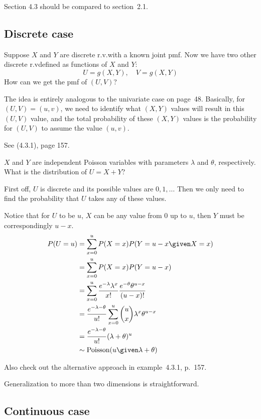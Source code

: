 \documentclass[12pt]{article}
\begin{document}
Section 4.3 should be compared to section~2.1.

\subsection{Discrete case}

Suppose $X$ and $Y$ are discrete r.v.\@ with a known joint pmf.
Now we have two other discrete r.v\@ defined as functions of $X$ and
$Y$:
\[
U = g(X, Y),\quad V = g(X, Y)
\]
How can we get the pmf of $(U, V)$?

The idea is entirely analogous to the univariate case on page~48.
Basically, for $(U,V) = (u,v)$,
we need to identify what $(X,Y)$ values will result in this $(U,V)$
value, and the total probability of these $(X,Y)$ values is the
probability for $(U,V)$ to assume the value $(u,v)$.

See (4.3.1), page 157.

\example%
$X$ and $Y$ are independent Poisson variables with parameters
$\lambda$ and $\theta$, respectively.
What is the distribution of $U = X + Y$?

First off, $U$ is discrete and its possible values are
$0,1,\dotso$ Then we only need to find the probability that
$U$ takes any of these values.

Notice that for $U$ to be $u$, $X$ can be any value from 0 up to $u$,
then $Y$ must be correspondingly $u - x$.
\[\begin{split}
P(U = u)
&= \sum_{x=0}^u P(X = x) P(Y = u-x \given X = x)
\\
&= \sum_{x=0}^u P(X = x) P(Y = u-x)
\\
&= \sum_{x=0}^u
    \frac{e^{-\lambda} \lambda^x}{x!}
    \frac{e^{-\theta} \theta^{u-x}}{(u-x)!}
\\
&= \frac{e^{-\lambda-\theta}}{u!}
    \sum_{x=0}^u {u\choose x} \lambda^x \theta^{u-x}
\\
&= \frac{e^{-\lambda-\theta}}{u!} (\lambda + \theta)^u
\\
&\sim
\text{Poisson}(u \given \lambda + \theta)
\end{split}
\]

Also check out the alternative approach in example~4.3.1, p.~157.

\alert[Generalization]%
Generalization to more than two dimensions is straightforward.

\subsection{Continuous case}
\end{document}
